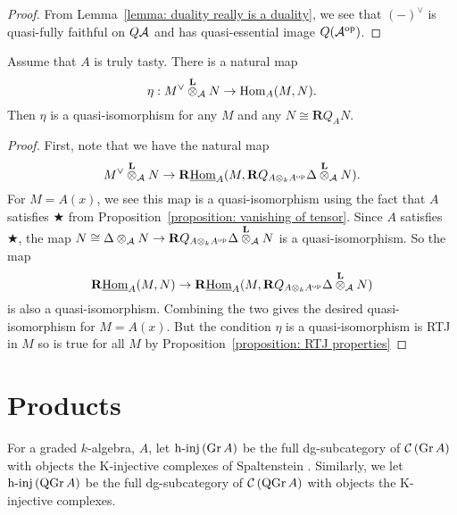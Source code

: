 \begin{proof}
  From Lemma~\ref{lemma: duality really is a duality}, we see that \((-)^\vee\) is quasi-fully faithful on \(Q\mathcal{A}\) and has quasi-essential image \(Q(\mathcal{A}^{\operatorname{op}})\). 
\end{proof}

\begin{lemma} \label{lemma: trace map}
  Assume that \(A\) is truly tasty. There is a natural map 
  \begin{displaymath}
    \eta : M^\vee \overset{\mathbf{L}}{\otimes}_{\mathcal A} N \to \operatorname{Hom}_A(M,N).
  \end{displaymath}
  Then \(\eta\) is a quasi-isomorphism for any \(M\) and any \(N \cong \mathbf{R}Q_A N\). 
\end{lemma}

\begin{proof}
  First, note that we have the natural map 
  \begin{displaymath}
    M^\vee \overset{\mathbf{L}}{\otimes}_{\mathcal A} N \to \mathbf{R}\underline{\operatorname{Hom}}_A(M, \mathbf{R}Q_{A \otimes_k A^{\operatorname{op}}} \Delta \overset{\mathbf{L}}{\otimes}_{\mathcal A} N).
  \end{displaymath}
  For \(M = A(x)\), we see this map is a quasi-isomorphism using the fact that \(A\) satisfies \(\bigstar\) from Proposition~\ref{proposition: vanishing of tensor}. 
  Since \(A\) satisfies \(\bigstar\), the map \(N \cong \Delta \otimes_{\mathcal A} N \to \mathbf{R}Q_{A \otimes_k A^{\operatorname{op}}} \Delta \overset{\mathbf{L}}{\otimes}_{\mathcal A} N\) is a quasi-isomorphism. So the map  
  \begin{displaymath}
    \mathbf{R}\underline{\operatorname{Hom}}_A(M, N) \to \mathbf{R}\underline{\operatorname{Hom}}_A(M, \mathbf{R}Q_{A \otimes_k A^{\operatorname{op}}} \Delta \overset{\mathbf{L}}{\otimes}_{\mathcal A} N)
  \end{displaymath}
  is also a quasi-isomorphism. Combining the two gives the desired quasi-isomorphism for \(M = A(x)\). But the condition \(\eta\) is a quasi-isomorphism is RTJ in \(M\) so is true for all \(M\) by Proposition~\ref{proposition: RTJ properties}
\end{proof}

\section{Products} \label{section: products}

\begin{definition}
  For a graded \(k\)-algebra, \(A\), let \(\operatorname{h-inj}\left(\operatorname{Gr}A\right)\) be the full dg-subcategory of \(\mathcal{C}\left(\operatorname{Gr}A\right)\) with objects the K-injective complexes of Spaltenstein \parencite{Spaltenstein88}. Similarly, we let \(\operatorname{h-inj}\left(\operatorname{QGr}A\right)\) be the full dg-subcategory of \(\mathcal{C}\left(\operatorname{QGr}A\right)\) with objects the K-injective complexes.
\end{definition}

